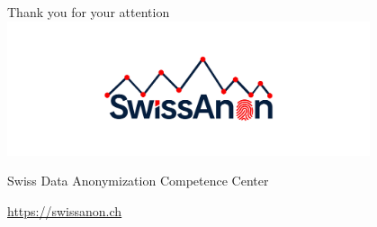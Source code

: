 \documentclass[
  ignorenonframetext,
  aspectratio=169,
]{beamer}
\begin{document}
\begin{frame}{}
\protect\hypertarget{section}{}
\centering

\Huge Thank you for your attention\\

\includegraphics[width=0.8\textwidth,height=\textheight]{gallery/SwissAnon.png}

\large Swiss Data Anonymization Competence Center

\href{https://swissanon.ch}{\color{blue}\underline{https://swissanon.ch}}
\end{frame}
\end{document}
